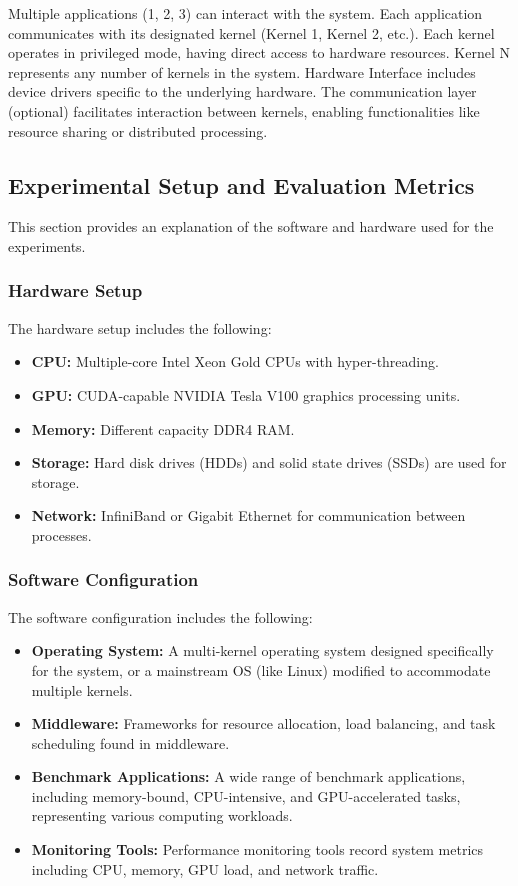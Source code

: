 \documentclass[16pt,a4paper]{article}
\begin{document}
Multiple applications (1, 2, 3) can interact with the system.
Each application communicates with its designated kernel (Kernel 1, Kernel 2, etc.).
Each kernel operates in privileged mode, having direct access to hardware resources.
Kernel N represents any number of kernels in the system.
Hardware Interface includes device drivers specific to the underlying hardware.
The communication layer (optional) facilitates interaction between kernels, enabling functionalities like resource sharing or distributed processing.

\subsection{Experimental Setup and Evaluation Metrics}

This section provides an explanation of the software and hardware used for the experiments.

\subsubsection{Hardware Setup}

The hardware setup includes the following:

\begin{itemize}
  \item \textbf{CPU:} Multiple-core Intel Xeon Gold CPUs with hyper-threading.
  \item \textbf{GPU:} CUDA-capable NVIDIA Tesla V100 graphics processing units.
  \item \textbf{Memory:} Different capacity DDR4 RAM.
  \item \textbf{Storage:} Hard disk drives (HDDs) and solid state drives (SSDs) are used for storage.
  \item \textbf{Network:} InfiniBand or Gigabit Ethernet for communication between processes.
\end{itemize}

\subsubsection{Software Configuration}

The software configuration includes the following:

\begin{itemize}
  \item \textbf{Operating System:} A multi-kernel operating system designed specifically for the system, or a mainstream OS (like Linux) modified to accommodate multiple kernels.
  \item \textbf{Middleware:} Frameworks for resource allocation, load balancing, and task scheduling found in middleware.
  \item \textbf{Benchmark Applications:} A wide range of benchmark applications, including memory-bound, CPU-intensive, and GPU-accelerated tasks, representing various computing workloads.
  \item \textbf{Monitoring Tools:} Performance monitoring tools record system metrics including CPU, memory, GPU load, and network traffic.
\end{itemize}
\end{document}
